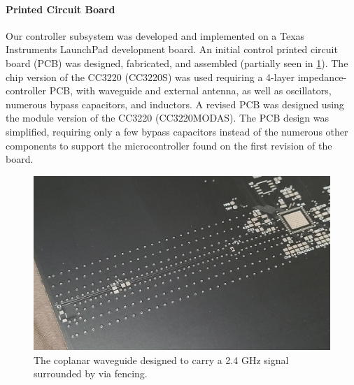 \paragraph{Printed Circuit Board} Our controller subsystem was developed and implemented on a Texas Instruments LaunchPad development board. An initial control printed circuit board (PCB) was designed, fabricated, and assembled (partially seen in \ref{fig:mcu_v1_cpwg}). The chip version of the CC3220 (CC3220S) was used requiring a 4-layer impedance-controller PCB, with waveguide and external antenna, as well as oscillators, numerous bypass capacitors, and inductors. A revised PCB was designed using the module version of the CC3220 (CC3220MODAS). The PCB design was simplified, requiring only a few bypass capacitors instead of the numerous other components to support the microcontroller found on the first revision of the board.

\begin{figure}[H]
    \centering
    \label{fig:mcu_v1_cpwg}
    \includegraphics[width=\linewidth]{images/mcu_v1_cpwg.jpg}
    \caption{The coplanar waveguide designed to carry a 2.4 GHz signal surrounded by via fencing.}
\end{figure}